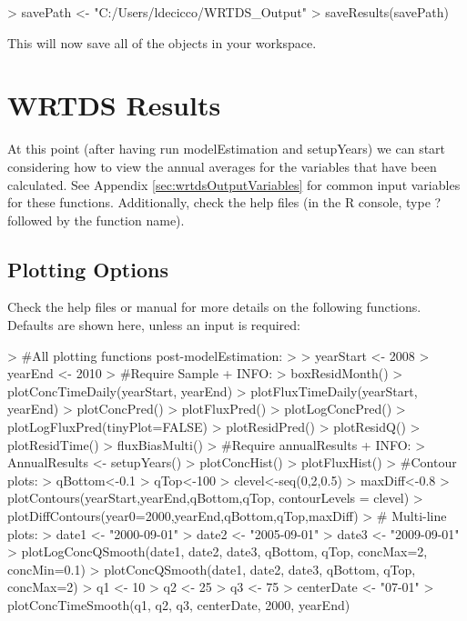 \documentclass[a4paper,11pt]{article}
\begin{document}
\begin{Schunk}
\begin{Sinput}
> savePath <- "C:/Users/ldecicco/WRTDS_Output"
> saveResults(savePath) 
\end{Sinput}
\end{Schunk}

This will now save all of the objects in your workspace.  

\section{WRTDS Results}
\label{sec:wrtdsResults}
At this point (after having run modelEstimation and setupYears) we can start considering how to view the annual averages for the variables that have been calculated.  See Appendix \ref{sec:wrtdsOutputVariables} for common input variables for these functions. Additionally, check the help files (in the R console, type ? followed by the function name).

\subsection{Plotting Options}
\label{sec:wrtdsPlotting}
Check the help files or manual for more details on the following functions.  Defaults are shown here, unless an input is required:

\begin{Schunk}
\begin{Sinput}
> #All plotting functions post-modelEstimation:
> 
> yearStart <- 2008
> yearEnd <- 2010
> #Require Sample + INFO:
> boxResidMonth()
> plotConcTimeDaily(yearStart, yearEnd)
> plotFluxTimeDaily(yearStart, yearEnd)
> plotConcPred()
> plotFluxPred()
> plotLogConcPred()
> plotLogFluxPred(tinyPlot=FALSE)
> plotResidPred()
> plotResidQ()
> plotResidTime()
> fluxBiasMulti()
> #Require annualResults + INFO:
> AnnualResults <- setupYears()
> plotConcHist()
> plotFluxHist()
> #Contour plots:
> qBottom<-0.1
> qTop<-100
> clevel<-seq(0,2,0.5)
> maxDiff<-0.8
> plotContours(yearStart,yearEnd,qBottom,qTop, contourLevels = clevel)
> plotDiffContours(year0=2000,yearEnd,qBottom,qTop,maxDiff)
> # Multi-line plots:
> date1 <- "2000-09-01"
> date2 <- "2005-09-01"
> date3 <- "2009-09-01"
> plotLogConcQSmooth(date1, date2, date3, qBottom, qTop, concMax=2, concMin=0.1)
> plotConcQSmooth(date1, date2, date3, qBottom, qTop, concMax=2)
> q1 <- 10
> q2 <- 25
> q3 <- 75
> centerDate <- "07-01"
> plotConcTimeSmooth(q1, q2, q3, centerDate, 2000, yearEnd)
\end{Sinput}
\end{Schunk}
\end{document}

